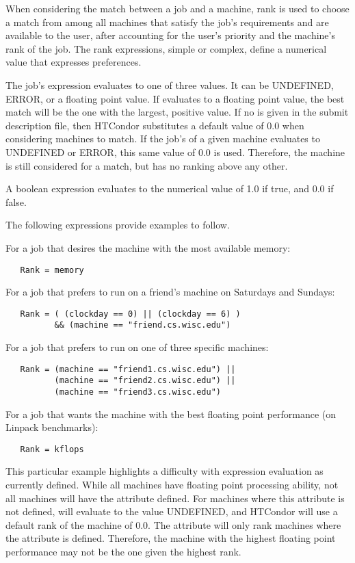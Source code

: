 When considering the match between a job and a machine, rank is used
to choose a match from among all machines that satisfy the job's
requirements and are available to the user, after accounting for
the user's priority and the machine's rank of the job.
The rank expressions, simple or complex, define a numerical value
that expresses preferences.

The job's  expression evaluates to one of three values.
It can be UNDEFINED, ERROR, or a floating point value.
If  evaluates to a floating point value,
the best match will be the one with the largest, positive value.
If no  is given 
in the submit description file,
then HTCondor substitutes a default value of 0.0 when considering
machines to match.
If the job's  of a given machine evaluates
to UNDEFINED or ERROR,
this same value of 0.0 is used.
Therefore, the machine is still considered for a match,
but has no ranking above any other.

A boolean expression evaluates to the numerical value of 1.0
if true, and 0.0 if false.

The following  expressions provide examples to
follow.

For a job that desires the machine with the most available memory:
\begin{verbatim}
   Rank = memory
\end{verbatim}

For a job that prefers to run on a friend's machine
on Saturdays and Sundays:
\begin{verbatim}
   Rank = ( (clockday == 0) || (clockday == 6) )
          && (machine == "friend.cs.wisc.edu")
\end{verbatim}

For a job that prefers to run on one of three specific machines:
\begin{verbatim}
   Rank = (machine == "friend1.cs.wisc.edu") ||
          (machine == "friend2.cs.wisc.edu") ||
          (machine == "friend3.cs.wisc.edu")
\end{verbatim}

For a job that wants the machine with the best floating point
performance (on Linpack benchmarks):
\begin{verbatim}
   Rank = kflops
\end{verbatim}
This particular example highlights a difficulty with  expression
evaluation as currently defined.
While all machines have floating point processing ability,
not all machines will have the  attribute defined.
For machines where this attribute is not defined,
 will evaluate to the value UNDEFINED, and
HTCondor will use a default rank of the machine of 0.0.
The  attribute will only rank machines where
the attribute is defined.
Therefore, the machine with the highest floating point
performance may not be the one given the highest rank.

